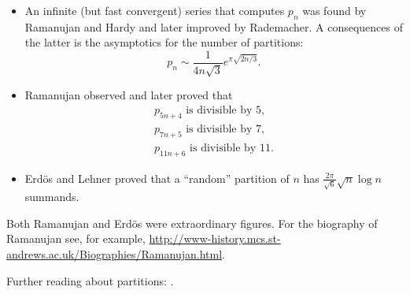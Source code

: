 

\setcounter{section}{3}
\setcounter{subsection}{9}
\setcounter{dfn}{22}

\begin{itemize}
\item 
An infinite (but fast convergent) series that computes $p_n$ was found by Ramanujan and Hardy and later improved by Rademacher.
A consequences of the latter is the asymptotics for the number of partitions:
\[
p_n \sim \frac{1}{4n\sqrt{3}} e^{\pi\sqrt{2n/3}}.
\]
\item
Ramanujan observed and later proved that
\begin{gather*}
p_{5n+4} \text{ is divisible by } 5,\\
p_{7n+5} \text{ is divisible by } 7,\\
p_{11n+6} \text{ is divisible by } 11.
\end{gather*}
\item
Erd\"os and Lehner proved that a ``random'' partition of $n$ has $\frac{2\pi}{\sqrt{6}} \sqrt{n} \log n$ summands.
\end{itemize}

Both Ramanujan and Erd\"os were extraordinary figures.
For the biography of Ramanujan see, for example,
\url{http://www-history.mcs.st-andrews.ac.uk/Biographies/Ramanujan.html}.

Further reading about partitions: \cite{AE04}.


\newpage



